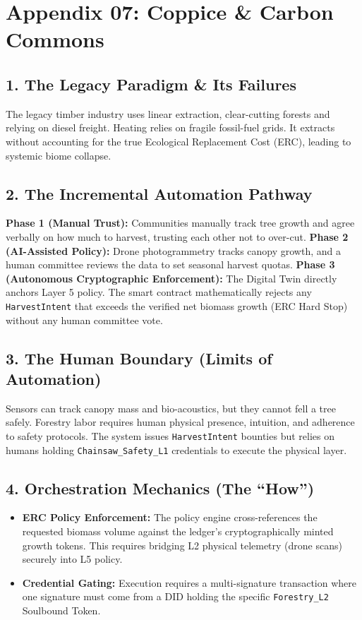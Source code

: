 \chapter*{Appendix 07: Coppice \& Carbon Commons}

\section*{1. The Legacy Paradigm \& Its Failures}
The legacy timber industry uses linear extraction, clear-cutting forests and relying on diesel freight. Heating relies on fragile fossil-fuel grids. It extracts without accounting for the true Ecological Replacement Cost (ERC), leading to systemic biome collapse.

\section*{2. The Incremental Automation Pathway}
\textbf{Phase 1 (Manual Trust):} Communities manually track tree growth and agree verbally on how much to harvest, trusting each other not to over-cut.
\textbf{Phase 2 (AI-Assisted Policy):} Drone photogrammetry tracks canopy growth, and a human committee reviews the data to set seasonal harvest quotas.
\textbf{Phase 3 (Autonomous Cryptographic Enforcement):} The Digital Twin directly anchors Layer 5 policy. The smart contract mathematically rejects any \texttt{HarvestIntent} that exceeds the verified net biomass growth (ERC Hard Stop) without any human committee vote.

\section*{3. The Human Boundary (Limits of Automation)}
Sensors can track canopy mass and bio-acoustics, but they cannot fell a tree safely. Forestry labor requires human physical presence, intuition, and adherence to safety protocols. The system issues \texttt{HarvestIntent} bounties but relies on humans holding \texttt{Chainsaw\_Safety\_L1} credentials to execute the physical layer.

\section*{4. Orchestration Mechanics (The ``How'')}
\begin{itemize}
    \item \textbf{ERC Policy Enforcement:} The policy engine cross-references the requested biomass volume against the ledger's cryptographically minted growth tokens. This requires bridging L2 physical telemetry (drone scans) securely into L5 policy.
    \item \textbf{Credential Gating:} Execution requires a multi-signature transaction where one signature must come from a DID holding the specific \texttt{Forestry\_L2} Soulbound Token.
\end{itemize}
